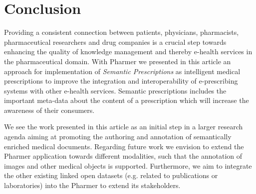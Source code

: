 \documentclass[10pt, conference, compsocconf]{IEEEtran}
\begin{document}
\section{Conclusion}

Providing a consistent connection between patients, physicians, pharmacists, pharmaceutical researchers and drug companies is a crucial step towards enhancing the quality of knowledge management and thereby e-health services in the pharmaceutical domain.
With Pharmer we presented in this article an approach for implementation of \emph{Semantic Prescriptions} as intelligent medical prescriptions to improve the integration and interoperability of e-prescribing systems with other e-health services.
Semantic prescriptions includes the important meta-data about the content of a prescription which will increase the awareness of their consumers.

We see the work presented in this article as an initial step in a larger research agenda aiming at promoting the authoring and annotation of semantically enriched medical documents.
Regarding future work we envision to extend the Pharmer application towards different modalities, such that the annotation of images and other medical objects is supported.
Furthermore, we aim to integrate the other existing linked open datasets (e.g. related to publications or laboratories) into the Pharmer to extend its stakeholders.









\end{document}
